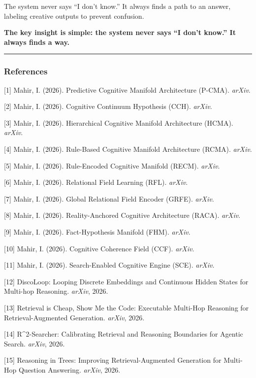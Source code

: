 \documentclass[
  11pt,
  a4paper,
]{article}
\begin{document}
The system never says ``I don't know.'' It always finds a path to an
answer, labeling creative outputs to prevent confusion.

\textbf{The key insight is simple: the system never says ``I don't
know.'' It always finds a way.}

\begin{center}\rule{0.5\linewidth}{0.5pt}\end{center}

\subsubsection{References}\label{references-7}

{[}1{]} Mahir, I. (2026). Predictive Cognitive Manifold Architecture
(P-CMA). \emph{arXiv}.

{[}2{]} Mahir, I. (2026). Cognitive Continuum Hypothesis (CCH).
\emph{arXiv}.

{[}3{]} Mahir, I. (2026). Hierarchical Cognitive Manifold Architecture
(HCMA). \emph{arXiv}.

{[}4{]} Mahir, I. (2026). Rule-Based Cognitive Manifold Architecture
(RCMA). \emph{arXiv}.

{[}5{]} Mahir, I. (2026). Rule-Encoded Cognitive Manifold (RECM).
\emph{arXiv}.

{[}6{]} Mahir, I. (2026). Relational Field Learning (RFL). \emph{arXiv}.

{[}7{]} Mahir, I. (2026). Global Relational Field Encoder (GRFE).
\emph{arXiv}.

{[}8{]} Mahir, I. (2026). Reality-Anchored Cognitive Architecture
(RACA). \emph{arXiv}.

{[}9{]} Mahir, I. (2026). Fact-Hypothesis Manifold (FHM). \emph{arXiv}.

{[}10{]} Mahir, I. (2026). Cognitive Coherence Field (CCF).
\emph{arXiv}.

{[}11{]} Mahir, I. (2026). Search-Enabled Cognitive Engine (SCE).
\emph{arXiv}.

{[}12{]} DiscoLoop: Looping Discrete Embeddings and Continuous Hidden
States for Multi-hop Reasoning. \emph{arXiv}, 2026.

{[}13{]} Retrieval is Cheap, Show Me the Code: Executable Multi-Hop
Reasoning for Retrieval-Augmented Generation. \emph{arXiv}, 2026.

{[}14{]} R\^{}2-Searcher: Calibrating Retrieval and Reasoning Boundaries
for Agentic Search. \emph{arXiv}, 2026.

{[}15{]} Reasoning in Trees: Improving Retrieval-Augmented Generation
for Multi-Hop Question Answering. \emph{arXiv}, 2026.
\end{document}
